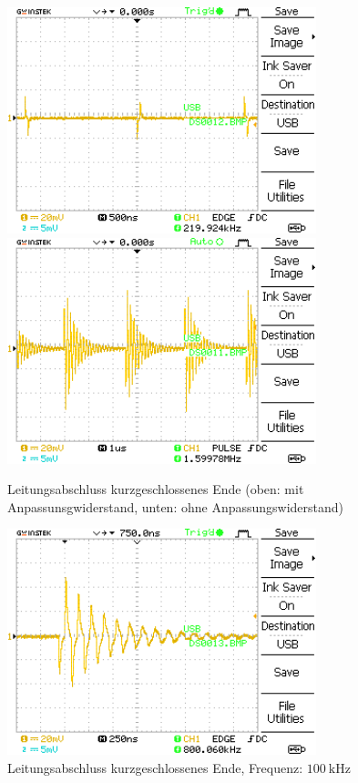\documentclass{article}
\begin{document}
				\begin{figure}[H]
					\centering
					\includegraphics[width=0.8\textwidth]{MesswerteVersuch1/DS0012.png}
					\includegraphics[width=0.8\textwidth]{MesswerteVersuch1/DS0011.png}
					\caption{Leitungsabschluss kurzgeschlossenes Ende (oben: mit Anpassunsgwiderstand, unten: ohne Anpassungswiderstand)}
					\label{fig:DS000}
				\end{figure}
\clearpage
				\begin{figure}[H]
					\centering
					\includegraphics[width=0.8\textwidth]{MesswerteVersuch1/DS0013.png}	

					\caption{Leitungsabschluss kurzgeschlossenes Ende, Frequenz: $\SI{100}{\kilo\hertz}$}
					\label{fig:DS0013}
				\end{figure}
\end{document}

